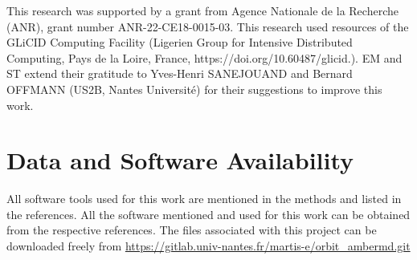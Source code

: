 \documentclass[12pt,a4paper]{achemso}
\begin{document}
\begin{acknowledgement}
This research was supported by a grant from Agence Nationale de la Recherche (ANR), grant number ANR-22-CE18-0015-03. This research used resources of the GLiCID Computing Facility (Ligerien Group for Intensive Distributed Computing, Pays de la Loire, France, https://doi.org/10.60487/glicid.). EM and ST extend their gratitude to Yves-Henri SANEJOUAND and Bernard OFFMANN (US2B, Nantes Université) for their suggestions to improve this work. 
\end{acknowledgement}

\section{Data and Software Availability}
All software tools used for this work are mentioned in the methods and listed in the references. All the software mentioned and used for this work can be obtained from the respective references. The files associated with this project can be downloaded freely from  \url{https://gitlab.univ-nantes.fr/martis-e/orbit_ambermd.git}
\end{document}
